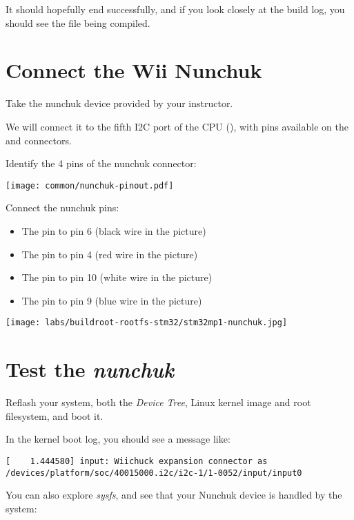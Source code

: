 It should hopefully end successfully, and if you look closely at the
build log, you should see the file  being compiled.

\section{Connect the Wii Nunchuk}

Take the nunchuk device provided by your instructor.

We will connect it to the fifth I2C port of the CPU (),
with pins available on the  and  connectors.

Identify the 4 pins of the nunchuk connector:

\begin{center}
\texttt{[image: common/nunchuk-pinout.pdf]}
\end{center}

Connect the nunchuk pins:
\begin{itemize}
\item The  pin to  pin 6 (black wire in the
  picture)
\item The  pin to  pin 4 (red wire in the
  picture)
\item The  pin to  pin 10 (white wire in the
  picture)
\item The  pin to  pin 9 (blue wire in the
  picture)
\end{itemize}

\begin{center}
\texttt{[image: labs/buildroot-rootfs-stm32/stm32mp1-nunchuk.jpg]}
\end{center}

\section{Test the {\em nunchuk}}

Reflash your system, both the {\em Device Tree}, Linux kernel image
and root filesystem, and boot it.

In the kernel boot log, you should see a message like:

\begin{verbatim}
[    1.444580] input: Wiichuck expansion connector as /devices/platform/soc/40015000.i2c/i2c-1/1-0052/input/input0
\end{verbatim}

You can also explore {\em sysfs}, and see that your Nunchuk device is
handled by the system:

